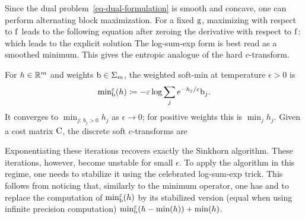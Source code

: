Since the dual problem~\eqref{eq-dual-formulation} is smooth and concave, one can perform alternating block maximization. For a fixed $\mathrm{g}$, maximizing with respect to $\mathrm{f}$ leads to the following equation after zeroing the derivative with respect to $\mathrm{f}$:
which leads to the explicit solution
The log-sum-exp form is best read as a smoothed minimum. This gives the entropic analogue of the hard $c$-transform.

\begin{defn}\label{def-discrete-soft-c-transform}
		For $h\in\mathbb{R}^m$ and weights $\mathrm{b}\in\Sigma_m$, the weighted soft-min at temperature $\epsilon>0$ is
		\[
			{\min}_{\mathrm{b}}^\varepsilon(h) \coloneqq -\varepsilon \log \sum_j e^{-h_j/\varepsilon} \mathrm{b}_j.
		\]
		It converges to $\min_{j:\,b_j>0}h_j$ as $\epsilon\to0$; for positive weights this is $\min_jh_j$. Given a cost matrix $\mathrm{C}$, the discrete soft $c$-transforms are
\end{defn}
Exponentiating these iterations recovers exactly the Sinkhorn algorithm. These iterations, however, become unstable for small $\epsilon$. To apply the algorithm in this regime, one needs to stabilize it using the celebrated log-sum-exp trick. This follows from noticing that, similarly to the minimum operator, one has
and to replace the computation of ${\min}_{\mathrm{b}}^\varepsilon(h)$ by its stabilized version (equal when using infinite precision computation) ${\min}_{\mathrm{b}}^\varepsilon(h-\min(h)) + \min(h)$.

